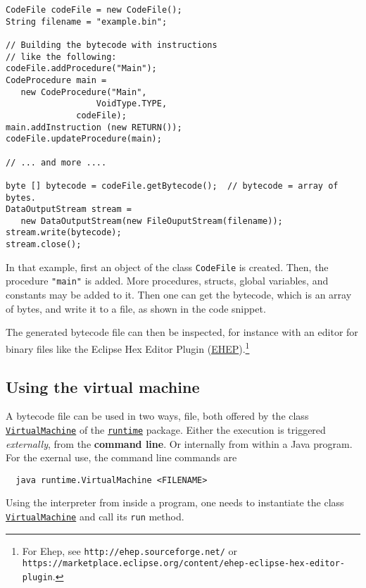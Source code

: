 \documentclass[11pt]{article}
\begin{document}
\begin{lstlisting}
CodeFile codeFile = new CodeFile();
String filename = "example.bin";

// Building the bytecode with instructions 
// like the following:
codeFile.addProcedure("Main");
CodeProcedure main = 
   new CodeProcedure("Main",
   	              VoidType.TYPE,
		      codeFile);
main.addInstruction (new RETURN());
codeFile.updateProcedure(main);

// ... and more ....

byte [] bytecode = codeFile.getBytecode();  // bytecode = array of bytes.
DataOutputStream stream = 
   new DataOutputStream(new FileOuputStream(filename));
stream.write(bytecode);
stream.close();
\end{lstlisting}

In that example, first an object of the class \texttt{CodeFile} is created. Then,
the procedure \texttt{"main"} is added. More procedures, structs, global
variables, and constants may be added to it. Then one can get the bytecode,
which is an array of bytes, and write it to a file, as shown in the code
snippet.

The generated bytecode file can then be inspected, for instance with an
editor for binary files like the Eclipse Hex Editor Plugin (\href{http://ehep.sourceforge.net/}{EHEP}).\footnote{For Ehep, see \texttt{http://ehep.sourceforge.net/} or
\texttt{https://marketplace.eclipse.org/content/ehep-eclipse-hex-editor-plugin}.}

\subsection{Using the virtual machine}
\label{sec:org932f857}

A bytecode file can be used in two ways, file, both offered by the class
\href{../../runtime/VirtualMachine.java}{\texttt{VirtualMachine}} of the \href{../../runtime/}{\texttt{runtime}} package. Either the execution is
triggered \emph{externally}, from the \textbf{command line}. Or internally from within
a Java program. For the exernal use, the command line commands are


\begin{verbatim}
  java runtime.VirtualMachine <FILENAME>
\end{verbatim}

Using the interpreter from inside a program, one needs to instantiate the
class \href{../../runtime/VirtualMachine.java}{\texttt{VirtualMachine}} and call its \texttt{run} method.
\end{document}
